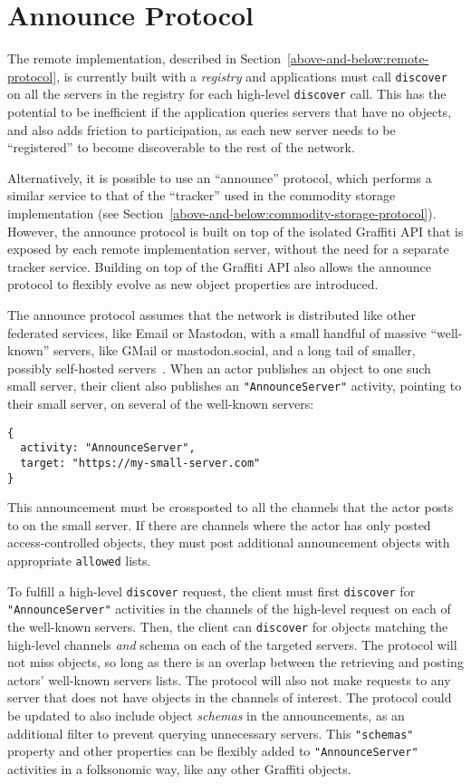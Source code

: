 \section{Announce Protocol}
\label{appendix:announce}

The remote implementation, described in Section~\ref{above-and-below:remote-protocol},
is currently built with a \emph{registry} and applications must
call \texttt{discover} on all the servers in the registry for
each high-level \texttt{discover} call.
This has the potential to be inefficient if the application queries
servers that have no objects, and also adds friction to participation,
as each new server needs to be ``registered'' to become discoverable
to the rest of the network.

Alternatively, it is possible to use an ``announce'' protocol,
which performs a similar service to that of the ``tracker'' used in
the commodity storage implementation (see Section~\ref{above-and-below:commodity-storage-protocol}). However, the announce protocol is built on top of the isolated Graffiti
API that is exposed by each remote implementation server, without the need for a separate
tracker service. Building on top of the Graffiti API also
allows the announce protocol to flexibly evolve as
new object properties are introduced.

The announce protocol assumes that the network is distributed like other
federated services, like Email or Mastodon, with a small handful of
massive ``well-known'' servers, like GMail or mastodon.social, and a long
tail of smaller, possibly self-hosted servers~\cite{mastodonchallenges}.
When an actor publishes an object to one such small server,
their client also publishes an \texttt{"AnnounceServer"}
activity, pointing to their small server, on several of the well-known
servers:
\begin{verbatim}
{
  activity: "AnnounceServer",
  target: "https://my-small-server.com"
}
\end{verbatim}
This announcement must be crossposted to all the channels
that the actor posts to on the small server.
If there are channels where the actor has only posted
access-controlled objects, they must post additional announcement
objects with appropriate \texttt{allowed} lists.

To fulfill a high-level \texttt{discover} request,
the client must first \texttt{discover} for
\texttt{"AnnounceServer"} activities in the channels of
the high-level request
on each of the well-known servers.
Then, the client can \texttt{discover} for objects
matching the high-level channels \emph{and} schema on each of the targeted servers.
The protocol will not miss objects, so long as there
is an overlap between the retrieving and posting actors' well-known
servers lists.
The protocol will also not make requests to any server
that does not have objects in the channels of interest.
The protocol could be updated to also include object
\emph{schemas} in the announcements, as an additional
filter to prevent querying unnecessary servers.
This \texttt{"schemas"} property and other properties
can be flexibly added to \texttt{"AnnounceServer"} activities
in a folksonomic way, like any other Graffiti objects.

